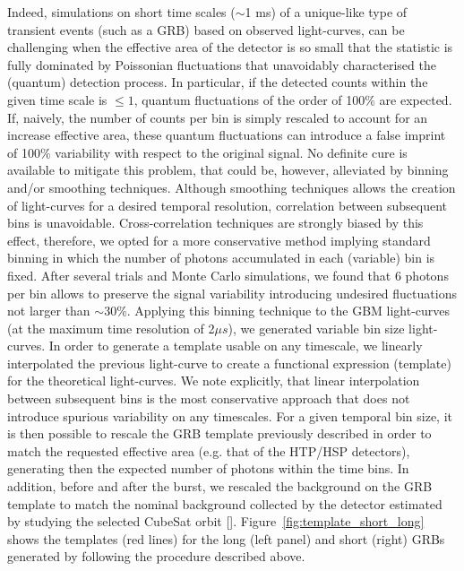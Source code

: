 \documentclass[]{spie}  %
\def \us{$\mu s$\xspace}
\begin{document}
Indeed, simulations on short time scales ($\sim$1 ms) of a unique-like type of transient events (such as a GRB) based on observed light-curves, can be challenging when the effective area of the detector is so small that the statistic is fully dominated by Poissonian fluctuations that unavoidably characterised the (quantum) detection process. In particular, if the detected counts within the given time scale is $\leq1$, quantum fluctuations of the order of 100\% are expected. If, naively, the number of counts per bin is simply rescaled to account for an increase effective area, these quantum fluctuations can introduce a false imprint of 100\% variability with respect to the original signal. No definite cure is available to mitigate this problem, that could be, however, alleviated by binning and/or smoothing techniques. Although smoothing techniques allows the creation of light-curves for a desired temporal resolution, correlation between subsequent bins is unavoidable. Cross-correlation techniques are strongly biased by this effect, therefore, we opted for a more conservative method implying standard binning in which the number of photons accumulated in each (variable) bin is fixed. After several trials and Monte Carlo simulations, we found that 6 photons per bin allows to preserve the signal variability introducing undesired fluctuations not larger than $\sim$30\%. Applying this binning technique to the GBM light-curves (at the maximum time resolution of 2\us), we generated variable bin size light-curves. In order to generate a template usable on any timescale, we linearly interpolated the previous light-curve to create a functional expression (template) for the theoretical light-curves. We note explicitly, that linear interpolation between subsequent bins is the most conservative approach that does not introduce spurious variability on any timescales. For a given temporal bin size, it is then possible to rescale the GRB template previously described in order to match the requested effective area (e.g. that of the HTP/HSP detectors), generating then the expected number of photons within the time bins. In addition, before and after the burst, we rescaled the background on the GRB template to match the nominal background collected by the detector estimated by studying the selected CubeSat orbit []. Figure~\ref{fig:template_short_long} shows the templates (red lines) for the long (left panel) and short (right) GRBs generated by following the procedure described above. 
\end{document}
